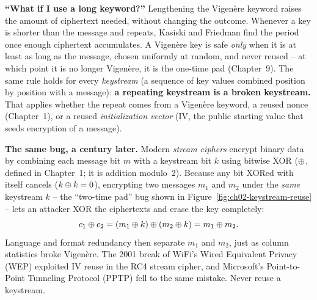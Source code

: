 \begin{trapbox}
\textbf{``What if I use a long keyword?''} Lengthening the Vigen\`ere keyword raises the amount
of ciphertext needed, without changing the outcome. Whenever a key is shorter than the message
and repeats, Kasiski and Friedman find the period once enough ciphertext accumulates. A
Vigen\`ere key is safe \emph{only} when it is at least as long as the message, chosen uniformly
at random, and never reused -- at which point it is no longer Vigen\`ere, it is the one-time pad
(Chapter~9). The same rule holds for every \emph{keystream} (a sequence of key values combined
position by position with a message): \textbf{a repeating keystream is a broken keystream.} That
applies whether the repeat comes from a Vigen\`ere keyword, a reused nonce (Chapter~1), or a reused
\emph{initialization vector} (IV, the public starting value that seeds encryption of a message).
\end{trapbox}

\begin{applicationbox}
\textbf{The same bug, a century later.} Modern \emph{stream ciphers} encrypt binary data by
combining each message bit $m$ with a keystream bit $k$ using bitwise XOR
($\oplus$, defined in Chapter~1; it is addition modulo~$2$). Because any bit XORed with itself cancels ($k \oplus k = 0$), encrypting two
messages $m_1$ and $m_2$ under the \emph{same} keystream $k$ -- the ``two-time pad'' bug
shown in Figure~\ref{fig:ch02-keystream-reuse} -- lets an attacker XOR the ciphertexts and erase
the key completely:
\[
  c_1 \oplus c_2 = (m_1 \oplus k) \oplus (m_2 \oplus k) = m_1 \oplus m_2.
\]
Language and format redundancy then separate $m_1$ and $m_2$, just as column statistics broke
Vigen\`ere. The 2001 break of WiFi's Wired Equivalent Privacy (WEP) exploited IV reuse in the
RC4 stream cipher, and Microsoft's Point-to-Point Tunneling Protocol (PPTP) fell to the same
mistake. Never reuse a keystream.
\end{applicationbox}

